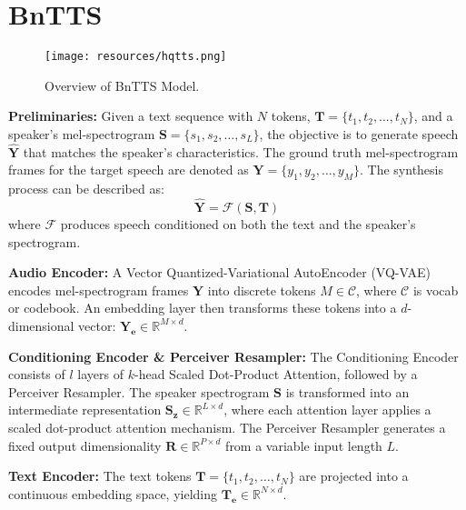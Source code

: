 \section{BnTTS}
\begin{figure}[ht!]
    \raggedleft
    \texttt{[image: resources/hqtts.png]} 
    \caption{Overview of BnTTS Model.} 
    \label{fig:xtts_train_diagram}
\end{figure}


\textbf{Preliminaries:} Given a text sequence with \( N \) tokens, \( \mathbf{T} = \{t_1, t_2, \ldots, t_N\} \), and a speaker's mel-spectrogram \( \mathbf{S} = \{s_1, s_2, \ldots, s_L\} \), the objective is to generate speech \( \hat{\mathbf{Y}} \) that matches the speaker's characteristics. The ground truth mel-spectrogram frames for the target speech are denoted as \( \mathbf{Y} = \{y_1, y_2, \ldots, y_M\} \). The synthesis process can be described as:
\[
\hat{\mathbf{Y}} = \mathcal{F}(\mathbf{S}, \mathbf{T})
\]
where \( \mathcal{F} \) produces speech conditioned on both the text and the speaker's spectrogram.

\noindent \textbf{Audio Encoder:} A Vector Quantized-Variational AutoEncoder (VQ-VAE) \cite{tortoise} encodes mel-spectrogram frames \( \mathbf{Y} \) into discrete tokens \( M \in \mathcal{C} \), where $\mathcal{C}$ is vocab or codebook. An embedding layer then transforms these tokens into a \( d \)-dimensional vector: \( \mathbf{Y_e} \in \mathbb{R}^{M \times d} \).

\noindent \textbf{Conditioning Encoder \& Perceiver Resampler:} The Conditioning Encoder \cite{casanova2024xtts} consists of \( l \) layers of \( k \)-head Scaled Dot-Product Attention, followed by a Perceiver Resampler. The speaker spectrogram \( \mathbf{S} \) is transformed into an intermediate representation \( \mathbf{S_z} \in \mathbb{R}^{L \times d} \), where each attention layer applies a scaled dot-product attention mechanism. The Perceiver Resampler generates a fixed output dimensionality \( \mathbf{R} \in \mathbb{R}^{P \times d} \) from a variable input length \( L \).

\noindent \textbf{Text Encoder:} The text tokens \( \mathbf{T} = \{t_1, t_2, \ldots, t_N\} \) are projected into a continuous embedding space, yielding \( \mathbf{T_e} \in \mathbb{R}^{N \times d} \).

